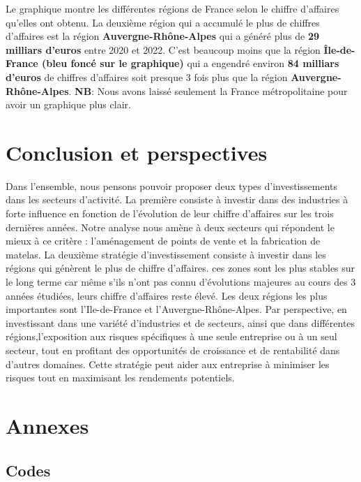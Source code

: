 \documentclass[mstat,12pt]{unswthesis}
\begin{document}
Le graphique montre les différentes régions de France selon le chiffre
d'affaires qu'elles ont obtenu. La deuxième région qui a accumulé le
plus de chiffres d'affaires est la région \textbf{Auvergne-Rhône-Alpes}
qui a généré plus de \textbf{29 milliars d'euros} entre 2020 et 2022.
C'est beaucoup moins que la région \textbf{Île-de-France (bleu foncé sur
le graphique)} qui a engendré environ \textbf{84 milliars d'euros} de
chiffres d'affaires soit presque 3 fois plus que la région
\textbf{Auvergne-Rhône-Alpes}. \textbf{NB}: Nous avons laissé seulement
la France métropolitaine pour avoir un graphique plus clair. \bigskip

\hypertarget{conclusion-et-perspectives}{%
\chapter{Conclusion et perspectives}\label{conclusion-et-perspectives}}

Dans l'ensemble, nous pensons pouvoir proposer deux types
d'investissements dans les secteurs d'activité. La première consiste à
investir dans des industries à forte influence en fonction de
l'évolution de leur chiffre d'affaires sur les trois dernières années.
Notre analyse nous amène à deux secteurs qui répondent le mieux à ce
critère : l'aménagement de points de vente et la fabrication de matelas.
La deuxième stratégie d'investissement consiste à investir dans les
régions qui génèrent le plus de chiffre d'affaires. ces zones sont les
plus stables sur le long terme car même s'ils n'ont pas connu
d'évolutions majeures au cours des 3 années étudiées, leurs chiffre
d'affaires reste élevé. Les deux régions les plus importantes sont
l'Ile-de-France et l'Auvergne-Rhône-Alpes. Par perspective, en
investissant dans une variété d'industries et de secteurs, ainsi que
dans différentes régions,l'exposition aux risques spécifiques à une
seule entreprise ou à un seul secteur, tout en profitant des
opportunités de croissance et de rentabilité dans d'autres domaines.
Cette stratégie peut aider aux entreprise à minimiser les risques tout
en maximisant les rendements potentiels. \bigskip

\hypertarget{annexes}{%
\chapter*{Annexes}\label{annexes}}

\hypertarget{codes}{%
\section*{\texorpdfstring{\textbf{Codes}}{Codes}}\label{codes}}
\end{document}
